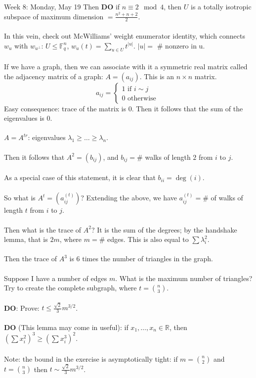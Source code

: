 \documentclass[12pt]{article}
\theoremstyle{remark}
\newcommand{\R}{\mathbb{R}}
\newcommand{\F}{\mathbb{F}}
\newcommand{\IF}{\text{ if }}
\newcommand{\ow}{\text{ otherwise }}
\begin{document}
\begin{section}{Week 8: Monday, May 19}
Then \textbf{DO} if $n \equiv 2 \mod 4$, then $U$ is a totally isotropic subspace of maximum dimension $= \frac { n^2 + n + 2}{2}$.
\\\\
In this vein, check out McWilliams' weight enumerator identity, which connects $w_u$ with $w_{u^\perp}$: $U \leq \F^n_q$, $w_u(t) = \sum_{u \in U} t^{|u|}$. $|u| =$ \# nonzero in u.
\\\\
If we have a graph, then we can associate with it a symmetric real matrix called the adjacency matrix of a graph: $A = (a_{ij})$. This is an $n\times n$ matrix. 
$$a_{ij} = \begin{cases}
1 \IF i \sim j
\\
0 \ow
\end{cases}
$$
Easy consequence: trace of the matrix is $0$. Then it follows that the sum of the eigenvalues is $0$. 
\\\\
$A = A^{tr}$: eigenvalues $\lambda_1 \geq \ldots \geq \lambda_n$.
\\\\
Then it follows that $A^2 = (b_{ij})$, and $b_{ij} = \#$ walks of length $2$ from $i$ to $j$. 
\\\\
As a special case of this statement, it is clear that $b_{ii} = \deg(i)$.
\\\\
So what is $A^{t} = (a_{ij}^(t))$? Extending the above, we have $a_{ij}^(t) = \#$ of walks of length $t$ from $i$ to $j$.
\\\\
Then what is the trace of $A^2$? It is the sum of the degrees; by the handshake lemma, that is $2m$, where $m = \#$ edges. This is also equal to $\sum \lambda_i^2$.
\\\\
Then the trace of $A^3$ is $6$ times the number of triangles in the graph.
\\\\
Suppose I have a number of edges $m$. What is the maximum number of triangles? Try to create the complete subgraph, where $t = {n \choose 3}$.
\\\\
\textbf{DO}: Prove:  $t \le \frac{\sqrt{2}}{3}m^{3/2}$.\\\\
\textbf{DO} (This lemma may come in useful): if $x_1,\ldots,x_n \in \R$, then $(\sum x_i ^2 ) ^3 \geq (\sum x_i^3)^2$.\\\\
Note: the bound in the exercise is asymptotically tight: if $m=\binom{n}{2}$
and $t=\binom{n}{3}$ then $t \sim \frac{\sqrt{2}}{3}m^{3/2}$.
\end{section}
\newpage
\end{document}
